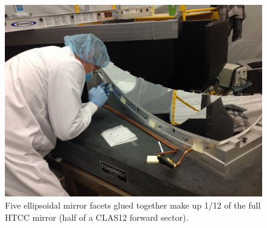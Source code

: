 \begin{figure}[ht]
    \centering
    \includegraphics[trim={20cm 15cm 0 10cm },clip,width=\linewidth]{images/Picture3.JPG}
    \caption{Five ellipsoidal mirror facets glued together make up 1/12 of the full HTCC mirror (half of a CLAS12 forward sector).}
    \label{fig:Picture3}
\end{figure}

